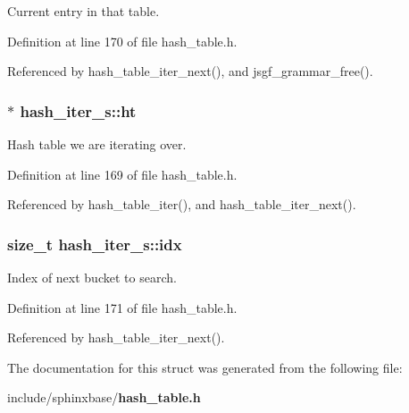 Current entry in that table. 



Definition at line 170 of file hash\-\_\-table.\-h.



Referenced by hash\-\_\-table\-\_\-iter\-\_\-next(), and jsgf\-\_\-grammar\-\_\-free().

\subsubsection[{ht}]{$\ast$ hash\-\_\-iter\-\_\-s\-::ht}\label{structhash__iter__s_a02844d3426aaa62e41086c98a052ed7d}


Hash table we are iterating over. 



Definition at line 169 of file hash\-\_\-table.\-h.



Referenced by hash\-\_\-table\-\_\-iter(), and hash\-\_\-table\-\_\-iter\-\_\-next().

\subsubsection[{idx}]{\setlength{\rightskip}{0pt plus 5cm}size\-\_\-t hash\-\_\-iter\-\_\-s\-::idx}\label{structhash__iter__s_a9cb2842206d721ef3ef9b15c133ba3c9}


Index of next bucket to search. 



Definition at line 171 of file hash\-\_\-table.\-h.



Referenced by hash\-\_\-table\-\_\-iter\-\_\-next().



The documentation for this struct was generated from the following file\-:\begin{DoxyCompactItemize}
\item 
include/sphinxbase/{\bf hash\-\_\-table.\-h}\end{DoxyCompactItemize}
